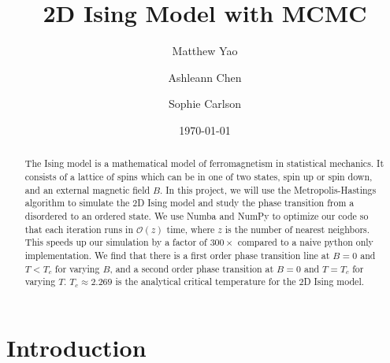 \documentclass[
 reprint,
 amsmath,
 amssymb,
 aps,
]{revtex4-2}
\begin{document}
\title{2D Ising Model with MCMC}

\author{Matthew Yao}
\author{Ashleann Chen}
\author{Sophie Carlson}



\date{\today}

\begin{abstract}
The Ising model is a mathematical model of ferromagnetism in statistical 
mechanics. 
It consists of a lattice of spins which can be in one of two states,
spin up or spin down, and an external magnetic field $ B $.
In this project, we will use the Metropolis-Hastings algorithm to simulate the
2D Ising model and study the phase transition from a disordered to an 
ordered state.
We use Numba and NumPy to optimize our code so that each iteration
runs in $ \mathcal{O}(z) $ time, where $ z $ is the number of nearest neighbors.
This speeds up our simulation by a factor of $ 300\times $ compared to 
a naive python only implementation.
We find that there is a first order phase transition line at $ B=0 $
and $ T < T_{c} $ for varying $ B $,
and a second order phase transition at $ B=0 $ and $ T = T_{c} $
for varying $ T $.
$ T_{c} \approx 2.269 $ is the analytical critical temperature for the 
2D Ising model.

\end{abstract}

\maketitle


\section{Introduction}
\label{sec:intro}
\end{document}
